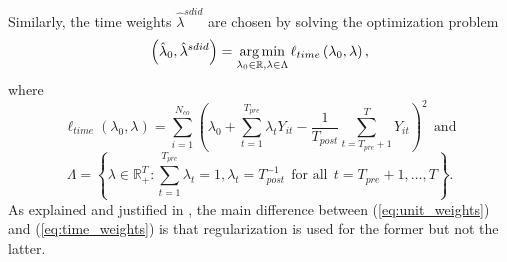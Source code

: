 \documentclass[../Main.tex]{subfiles}
\begin{document}
Similarly, the time weights $\hat{\lambda}^{sdid}$ are chosen by solving the optimization problem
\begin{equation} \label{eq:time_weights}
    \left(\hat{\lambda}_0,\hat{\lambda}^{sdid}\right)=\operatorname*{arg\,min}_{\lambda_0\in\mathbb{R},\lambda\in\Lambda}\ell_{time}\left(\lambda_0,\lambda\right),
\end{equation}
where
\begin{equation*}
    \ell_{time}\left(\lambda_0,\lambda\right)=\sum_{i=1}^{N_{co}}\left(\lambda_0+\sum_{t=1}^{T_{pre}}\lambda_tY_{it}-\frac{1}{T_{post}}\sum_{t=T_{pre}+1}^TY_{it}\right)^2~~\text{and}
\end{equation*}
\begin{equation*}
    \Lambda=\left\{\lambda\in\mathbb{R}_+^T:\sum_{t=1}^{T_{pre}}\lambda_t=1,\lambda_t=T_{post}^{-1} ~~ \text{for all} ~~ t=T_{pre}+1,\dots ,T \right\}.
\end{equation*}
As explained and justified in \citet{arkhangelsky2021synthetic}, the main difference between (\ref{eq:unit_weights}) and (\ref{eq:time_weights}) is that regularization is used for the former but not the latter.
\end{document}
